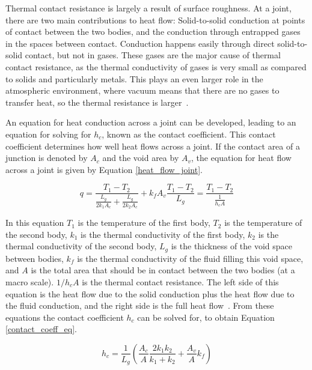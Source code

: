 Thermal contact resistance is largely a result of surface roughness. At a joint, there are two main contributions to heat flow: Solid-to-solid conduction at points of contact between the two bodies, and the conduction through entrapped gases in the spaces between contact. Conduction happens easily through direct solid-to-solid contact, but not in gases. These gases are the major cause of thermal contact resistance, as the thermal conductivity of gases is very small as compared to solids and particularly metals. This plays an even larger role in the atmospheric environment, where vacuum means that there are no gases to transfer heat, so the thermal resistance is larger~\citep{Heat_Transfer_Resistance}. 

An equation for heat conduction across a joint can be developed, leading to an equation for solving for $h_c$, known as the contact coefficient. This contact coefficient determines how well heat flows across a joint. If the contact area of a junction is denoted by $A_c$ and the void area by $A_v$, the equation for heat flow across a joint is given by Equation \ref{heat_flow_joint}. %

\begin{equation}\label{heat_flow_joint}
    q = \frac{T_1 - T_2}{\frac{L_g}{2k_1A_c}+\frac{L_g}{2k_2A_c}}+k_fA_v\frac{T_1-T_2}{L_g} = \frac{T_1-T_2}{\frac{1}{h_cA}}
\end{equation}

In this equation $T_1$ is the temperature of the first body, $T_2$ is the temperature of the second body, $k_1$ is the thermal conductivity of the first body, $k_2$ is the thermal conductivity of the second body, $L_g$ is the thickness of the void space between bodies, $k_f$ is the thermal conductivity of the fluid filling this void space, and $A$ is the total area that should be in contact between the two bodies (at a macro scale). $1/h_cA$ is the thermal contact resistance. The left side of this equation is the heat flow due to the solid conduction plus the heat flow due to the fluid conduction, and the right side is the full heat flow~\citep{Heat_Transfer_Resistance}. From these equations the contact coefficient $h_c$ can be solved for, to obtain Equation \ref{contact_coeff_eq}.

\begin{equation}\label{contact_coeff_eq}
    h_c = \frac{1}{L_g}\left( \frac{A_c}{A}\frac{2k_1k_2}{k_1+k_2}+\frac{A_v}{A}k_f \right)
\end{equation}

